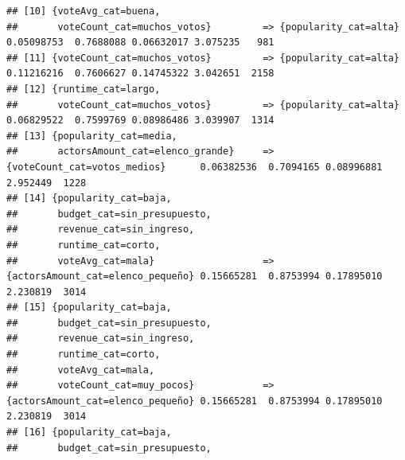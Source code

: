 \documentclass[
]{article}
\begin{document}
\begin{verbatim}
## [10] {voteAvg_cat=buena,                                                                                                      
##       voteCount_cat=muchos_votos}         => {popularity_cat=alta}             0.05098753  0.7688088 0.06632017 3.075235   981
## [11] {voteCount_cat=muchos_votos}         => {popularity_cat=alta}             0.11216216  0.7606627 0.14745322 3.042651  2158
## [12] {runtime_cat=largo,                                                                                                      
##       voteCount_cat=muchos_votos}         => {popularity_cat=alta}             0.06829522  0.7599769 0.08986486 3.039907  1314
## [13] {popularity_cat=media,                                                                                                   
##       actorsAmount_cat=elenco_grande}     => {voteCount_cat=votos_medios}      0.06382536  0.7094165 0.08996881 2.952449  1228
## [14] {popularity_cat=baja,                                                                                                    
##       budget_cat=sin_presupuesto,                                                                                             
##       revenue_cat=sin_ingreso,                                                                                                
##       runtime_cat=corto,                                                                                                      
##       voteAvg_cat=mala}                   => {actorsAmount_cat=elenco_pequeño} 0.15665281  0.8753994 0.17895010 2.230819  3014
## [15] {popularity_cat=baja,                                                                                                    
##       budget_cat=sin_presupuesto,                                                                                             
##       revenue_cat=sin_ingreso,                                                                                                
##       runtime_cat=corto,                                                                                                      
##       voteAvg_cat=mala,                                                                                                       
##       voteCount_cat=muy_pocos}            => {actorsAmount_cat=elenco_pequeño} 0.15665281  0.8753994 0.17895010 2.230819  3014
## [16] {popularity_cat=baja,                                                                                                    
##       budget_cat=sin_presupuesto,                                                                                             

\end{verbatim}
\end{document}
